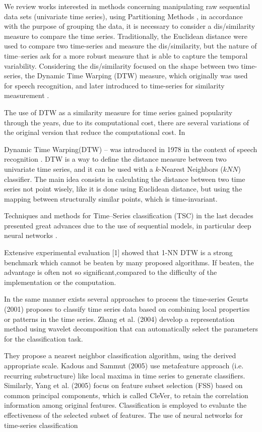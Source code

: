 We review works interested in methods concerning manipulating raw sequential data sets (univariate time series), using Partitioning Methods \cite{Kaufman2009}, in accordance with the purpose of grouping the data, it is necessary to consider a dis/similarity measure to compare the time series. Traditionally, the Euclidean distance were used to compare two time-series and measure the dis/similarity, but the nature of time--series ask for a more robust measure that is able to capture the temporal variability. Considering the dis/similarity focused on the shape between two time-series, the Dynamic Time Warping (DTW) measure, which originally was used for speech recognition, and later introduced to time-series for similarity measurement \cite{Sakoe1978}.

The use of DTW as a similarity measure for time series gained popularity through the years, due to its computational cost, there are several variations of the original version that reduce the computational cost. In 

Dynamic  Time  Warping(DTW) – was introduced in 1978 in the context of speech recognition \cite{Sakoe1978}. DTW is a way to define the distance measure between two univariate time series, and it can be used with a $k$-Nearest Neighbors ($kNN$) classifier. The main idea consists in calculating the distance between two time series not point wisely, like it is done using Euclidean distance, but using the mapping between structurally similar points, which is time-invariant.

Techniques and methods for Time--Series classification (TSC) in the last decades presented great advances due to the use of sequential models, in particular deep neural networks \cite{Fawaz2019}. 

Extensive  experimental  evaluation  [1] showed  that  1-NN  DTW  is  a  strong  benchmark  which  cannot  be  beaten  by many proposed algorithms. If beaten, the advantage is often not so significant,compared to the difficulty of the implementation or the computation.

In the same manner exists several approaches to process the time-series Geurts (2001) proposes to classify time series data based on combining local properties or patterns in the time series. Zhang et al. (2004) develop a representation method using wavelet decomposition that can automatically select the parameters for the classification task. 

They propose a nearest neighbor classification algorithm, using the derived appropriate scale. Kadous and Sammut (2005) use metafeature approach (i.e. recurring substructure) like local maxima in time series to generate classifiers. Similarly, Yang et al. (2005) focus on feature subset selection (FSS) based on common principal components, which is called CleVer, to retain the correlation information among original features. Classification is employed to evaluate the effectiveness of the selected subset of features. 
The use of neural networks for time-series classification


